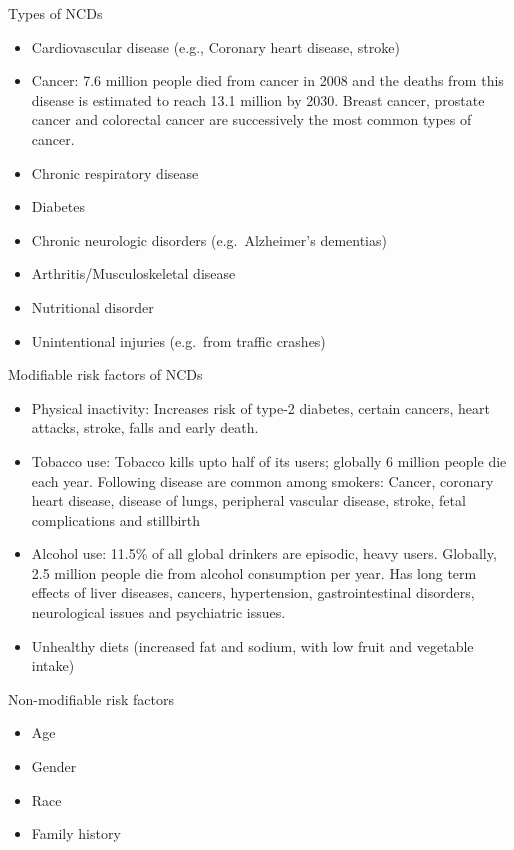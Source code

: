 \documentclass[
  openany]{book}
\providecommand{\tightlist}{%
  \setlength{\itemsep}{0pt}\setlength{\parskip}{0pt}}
\begin{document}
Types of NCDs

\begin{itemize}
\tightlist
\item
  Cardiovascular disease (e.g., Coronary heart disease, stroke)
\item
  Cancer: 7.6 million people died from cancer in 2008 and the deaths from this disease is estimated to reach 13.1 million by 2030. Breast cancer, prostate cancer and colorectal cancer are successively the most common types of cancer.
\item
  Chronic respiratory disease
\item
  Diabetes
\item
  Chronic neurologic disorders (e.g.~Alzheimer's dementias)
\item
  Arthritis/Musculoskeletal disease
\item
  Nutritional disorder
\item
  Unintentional injuries (e.g.~from traffic crashes)
\end{itemize}

Modifiable risk factors of NCDs

\begin{itemize}
\tightlist
\item
  Physical inactivity: Increases risk of type-2 diabetes, certain cancers, heart attacks, stroke, falls and early death.
\item
  Tobacco use: Tobacco kills upto half of its users; globally 6 million people die each year. Following disease are common among smokers: Cancer, coronary heart disease, disease of lungs, peripheral vascular disease, stroke, fetal complications and stillbirth
\item
  Alcohol use: 11.5\% of all global drinkers are episodic, heavy users. Globally, 2.5 million people die from alcohol consumption per year. Has long term effects of liver diseases, cancers, hypertension, gastrointestinal disorders, neurological issues and psychiatric issues.
\item
  Unhealthy diets (increased fat and sodium, with low fruit and vegetable intake)
\end{itemize}

Non-modifiable risk factors

\begin{itemize}
\tightlist
\item
  Age
\item
  Gender
\item
  Race
\item
  Family history
\end{itemize}
\end{document}

